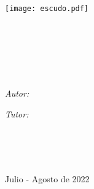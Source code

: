 \graphicspath{{./portada/figuras/}}
\begin{titlepage}
\begin{center}

\vfill
\texttt{[image: escudo.pdf]}\\[0.2cm]
{\scshape\LARGE \univname\par}\vspace{0.3cm} %
\textsc{\Large \facultyname}\\[0.3cm] %
\Large \worktype\\ [0.2cm]

\HRule \\[0.4cm] %
{\Large \bfseries \ttitle\par}\vspace{0.4cm} %
\HRule \\[0.5cm] %

\begin{minipage}[t]{0.4\textwidth}
\begin{flushleft} \large
\emph{Autor:}\\
\authorname %
\end{flushleft}
\end{minipage}
\begin{minipage}[t]{0.4\textwidth}
\begin{flushright} \large
\emph{Tutor:} \\
\supname %
\end{flushright}
\end{minipage}\\[1.5cm]

\vfill


\large
\deptname\\[0cm] %
\institutename\\[0cm] %


{\large Julio - Agosto de 2022}\\[4cm] %

\vfill
\end{center}
\end{titlepage}

